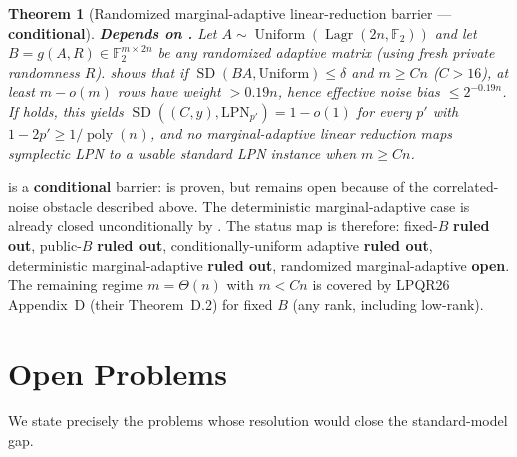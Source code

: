 \documentclass[11pt,a4paper]{article}
\theoremstyle{plain}
\newtheorem{theorem}{Theorem}[section]
\theoremstyle{definition}
\newcommand{\F}{\mathbb{F}}
\DeclareMathOperator{\Lagr}{Lagr}
\begin{document}
\begin{theorem}[Randomized marginal-adaptive linear-reduction barrier --- \textbf{conditional}]
\label{thm:marginal-adaptive}
\textbf{Depends on .}  Let $A\sim\operatorname{Uniform}(\Lagr(2n,\F_2))$ and let $B=g(A,R)\in\F_2^{m\times 2n}$ be any randomized adaptive matrix (using fresh private randomness $R$).   shows that if $\operatorname{SD}(BA,\text{Uniform})\le\delta$ and $m\ge Cn$ ($C>16$), at least $m-o(m)$ rows have weight $>0.19n$, hence effective noise bias $\le 2^{-0.19n}$.  If  holds, this yields $\operatorname{SD}((C,y),\mathrm{LPN}_{p'})=1-o(1)$ for every $p'$ with $1-2p'\ge 1/\operatorname{poly}(n)$, and no marginal-adaptive linear reduction maps symplectic LPN to a usable standard LPN instance when $m\ge Cn$.
\end{theorem}

 is a \textbf{conditional} barrier:  is proven, but  remains open because of the correlated-noise obstacle described above.  The deterministic marginal-adaptive case is already closed unconditionally by . The status map is therefore: fixed-$B$ \textbf{ruled out}, public-$B$ \textbf{ruled out}, conditionally-uniform adaptive \textbf{ruled out}, deterministic marginal-adaptive \textbf{ruled out}, randomized marginal-adaptive \textbf{open}.  The remaining regime $m=\Theta(n)$ with $m<Cn$ is covered by LPQR26 Appendix~D (their Theorem~D.2) for fixed $B$ (any rank, including low-rank).

\section{Open Problems}
\label{sec:open}

We state precisely the problems whose resolution would close the standard-model gap.
\end{document}
